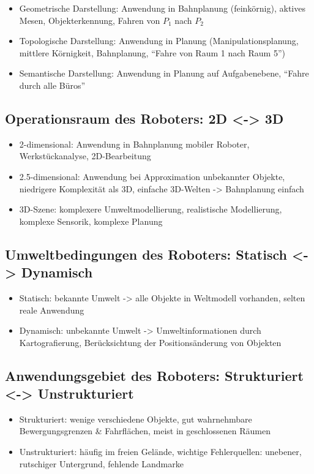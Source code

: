 \documentclass[paper=a4, fontsize=11pt]{scrartcl} %
\numberwithin{equation}{section} %
\numberwithin{figure}{section} %
\numberwithin{table}{section} %
\begin{document}
\begin{itemize}
\item Geometrische Darstellung: Anwendung in Bahnplanung (feinkörnig), aktives Mesen, Objekterkennung, Fahren von $P_1$ nach $P_2$
\item Topologische Darstellung: Anwendung in Planung (Manipulationsplanung, mittlere Körnigkeit, Bahnplanung, ``Fahre von Raum 1 nach Raum 5'')
\item Semantische Darstellung: Anwendung in Planung auf Aufgabenebene, ``Fahre durch alle Büros''
\end{itemize}

\subsection{Operationsraum des Roboters: 2D <-> 3D}
\begin{itemize}
\item 2-dimensional: Anwendung in Bahnplanung mobiler Roboter, Werkstückanalyse, 2D-Bearbeitung
\item 2.5-dimensional: Anwendung bei Approximation unbekannter Objekte, niedrigere Komplexität als 3D, einfache 3D-Welten -> Bahnplanung einfach
\item 3D-Szene: komplexere Umweltmodellierung, realistische Modellierung, komplexe Sensorik, komplexe Planung
\end{itemize}

\subsection{Umweltbedingungen des Roboters: Statisch <-> Dynamisch}
\begin{itemize}
\item Statisch: bekannte Umwelt -> alle Objekte in Weltmodell vorhanden, selten reale Anwendung
\item Dynamisch: unbekannte Umwelt -> Umweltinformationen durch Kartografierung, Berücksichtung der Positionsänderung von Objekten
\end{itemize}

\subsection{Anwendungsgebiet des Roboters: Strukturiert <-> Unstrukturiert}
\begin{itemize}
\item Strukturiert: wenige verschiedene Objekte, gut wahrnehmbare Bewergungsgrenzen \& Fahrflächen, meist in geschlossenen Räumen
\item Unstrukturiert: häufig im freien Gelände, wichtige Fehlerquellen: unebener, rutschiger Untergrund, fehlende Landmarke
\end{itemize}
\end{document}
